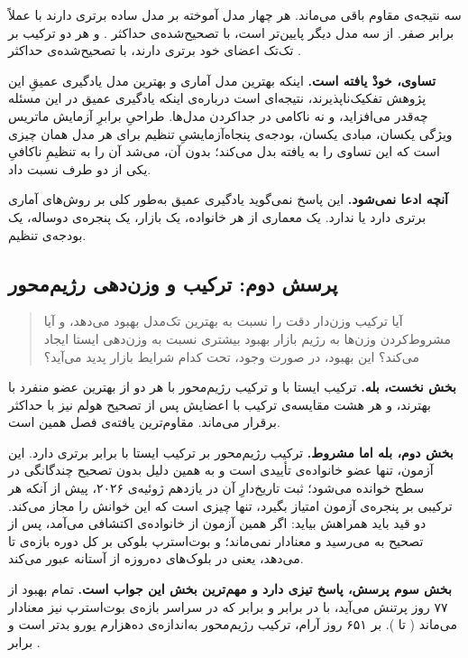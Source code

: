 سه نتیجه‌ی مقاوم باقی می‌ماند. هر چهار مدل آموخته بر مدل ساده برتری دارند با
 عملاً برابر صفر.  از سه مدل دیگر پایین‌تر است، با 
تصحیح‌شده‌ی حداکثر . و هر دو ترکیب بر تک‌تک اعضای خود برتری دارند،
با  تصحیح‌شده‌ی حداکثر .

\textbf{تساوی، خودْ یافته است.} اینکه بهترین مدل آماری و بهترین مدل یادگیری
عمیقِ این پژوهش تفکیک‌ناپذیرند، نتیجه‌ای است درباره‌ی اینکه یادگیری عمیق در این
مسئله چه‌قدر می‌افزاید، و نه ناکامی در جداکردن مدل‌ها. طراحیِ برابرِ آزمایش
 ماتریس ویژگی یکسان، مبادی یکسان، بودجه‌ی پنجاه‌آزمایشیِ تنظیم برای هر
مدل  همان چیزی است که این تساوی را به یافته بدل می‌کند؛ بدون آن،
می‌شد آن را به تنظیمِ ناکافیِ یکی از دو طرف نسبت داد.

\textbf{آنچه ادعا نمی‌شود.} این پاسخ نمی‌گوید یادگیری عمیق به‌طور کلی بر
روش‌های آماری برتری دارد یا ندارد. یک معماری از هر خانواده، یک بازار، یک
پنجره‌ی دوساله، یک بودجه‌ی تنظیم.

\subsection*{پرسش دوم: ترکیب و وزن‌دهی رژیم‌محور}

\begin{quote}
آیا ترکیب وزن‌دار دقت را نسبت به بهترین تک‌مدل بهبود می‌دهد، و آیا
مشروط‌کردن وزن‌ها به رژیم بازار بهبود بیشتری نسبت به وزن‌دهی ایستا ایجاد
می‌کند؟ این بهبود، در صورت وجود، تحت کدام شرایط بازار پدید می‌آید؟
\end{quote}

\textbf{بخش نخست، بله.} ترکیب ایستا با  و ترکیب رژیم‌محور با
 هر دو از بهترین عضو منفرد   با  
بهترند، و هر هشت مقایسه‌ی ترکیب با اعضایش پس از تصحیح هولم نیز با 
حداکثر  برقرار می‌ماند. مقاوم‌ترین یافته‌ی فصل همین است.

\textbf{بخش دوم، بله اما مشروط.} ترکیب رژیم‌محور بر ترکیب ایستا با 
برابر  برتری دارد. این آزمون، تنها عضو خانواده‌ی تأییدی است و به
همین دلیل بدون تصحیح چندگانگی در سطح  خوانده می‌شود؛ ثبت تاریخ‌دارِ آن
در یازدهم ژوئیه‌ی ۲۰۲۶، پیش از آنکه هر ترکیبی بر پنجره‌ی آزمون امتیاز بگیرد، تنها
چیزی است که این خوانش را مجاز می‌کند. دو قید باید همراهش بیاید: اگر همین آزمون
از خانواده‌ی اکتشافی می‌آمد، پس از تصحیح به  می‌رسید و معنادار
نمی‌ماند؛ و بوت‌استرپ بلوکی بر کل دوره بازه‌ی  تا  می‌دهد،
یعنی در بلوک‌های ده‌روزه از آستانه عبور می‌کند.

\textbf{بخش سوم پرسش، پاسخ تیزی دارد و مهم‌ترین بخش این جواب است.} تمام بهبود
از ۷۷ روز پرتنش می‌آید، با  در برابر  و  برابر
  که در سراسر بازه‌ی بوت‌استرپ نیز معنادار می‌ماند
( تا ). بر ۶۵۱ روز آرام، ترکیب رژیم‌محور به‌اندازه‌ی
ده‌هزارم یورو بدتر است و  برابر .


